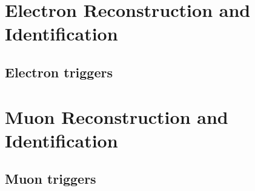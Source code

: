 \section{Electron Reconstruction and Identification}
\label{sec:reco-el}

\subsection{Electron triggers}
\label{sec:reco-el-triggers}

\section{Muon Reconstruction and Identification}
\label{sec:reco-mu}

\subsection{Muon triggers}
\label{sec:reco-mu-triggers}
